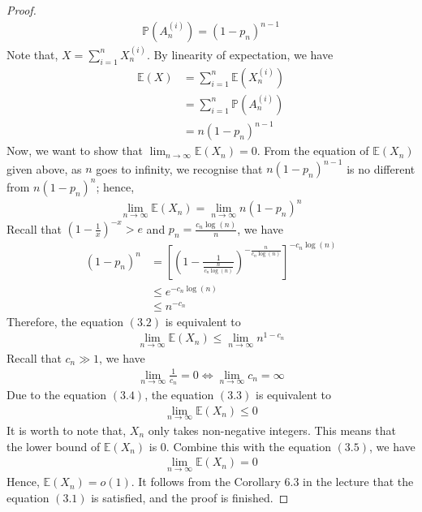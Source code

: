 \begin{proof}
\begin{align*}
    \mathbb{P}(A_{n}^{(i)}) = (1 - p_{n})^{n-1} \tag{3.2}
  \end{align*}
  Note that, $X = \sum_{i = 1}^{n}  X_{n}^{(i)}$. By linearity of expectation, we have
  \begin{align*}
    \mathbb{E}(X) &= \sum_{i = 1}^{n} \mathbb{E}(X_{n}^{(i)}) \\
                  &= \sum_{i = 1}^{n} \mathbb{P}(A_{n}^{(i)}) \\
                  &= n (1 - p_{n})^{n - 1}
  \end{align*}
  Now, we want to show that $\lim_{n \to \infty} \mathbb{E}(X_{n}) = 0$. From the equation of $\mathbb{E}(X_{n})$ given above, as $n$ goes to infinity, we recognise that $n (1 - p_{n})^{n - 1}$ is no different from $n (1 - p_{n})^{n}$; hence,
  \begin{align*}
    \lim_{n \to \infty} \mathbb{E}(X_{n}) = \lim_{n \to \infty} n (1 - p_{n})^{n}
  \end{align*}
  Recall that $\left( 1 - \frac{1}{x} \right)^{-x} > e$ and $p_{n} = \frac{c_{n} \log(n)}{n}$, we have
  \begin{align*}
    (1 - p_{n})^{n} &= \left[ \left( 1 - \frac{1}{\frac{n}{c_{n} \log(n)}} \right)^{-\frac{n}{c_{n} \log(n)}} \right]^{-c_{n} \log(n)} \\
                    &\leq e^{-c_{n} \log(n)} \\
                    &\leq n^{-c_{n}}
  \end{align*}
  Therefore, the equation $(3.2)$ is equivalent to
  \begin{align*}
    \lim_{n \to \infty} \mathbb{E}(X_{n}) \leq \lim_{n \to \infty} n^{1 - c_{n}} \tag{3.3}
  \end{align*}
  Recall that $c_{n} \gg 1$, we have
  \begin{align*}
    \lim_{n \to \infty} \frac{1}{c_{n}} = 0 \Leftrightarrow \lim_{n \to \infty} c_{n} = \infty \tag{3.4}
  \end{align*}
  Due to the equation $(3.4)$, the equation $(3.3)$ is equivalent to
  \begin{align*}
    \lim_{n \to \infty} \mathbb{E}(X_{n}) \leq 0 \tag{3.5}
  \end{align*}
  It is worth to note that, $X_{n}$ only takes non-negative integers. This means that the lower bound of $\mathbb{E}(X_{n})$ is $0$. Combine this with the equation $(3.5)$, we have 
  \begin{align*}
    \lim_{n \to \infty} \mathbb{E}(X_{n}) = 0
  \end{align*}
  Hence, $\mathbb{E}(X_{n}) = o(1)$. It follows from the Corollary $6.3$ in the lecture that the equation $(3.1)$ is satisfied, and the proof is finished.
\end{proof}

